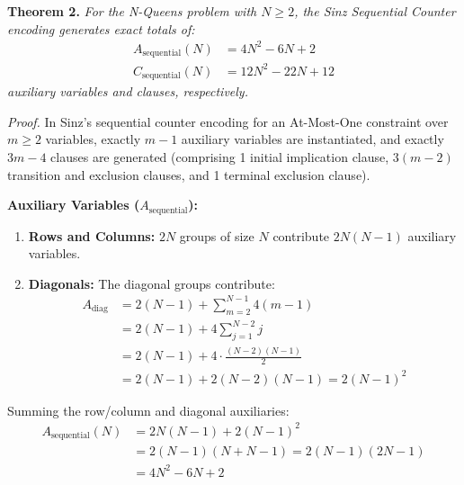 \textbf{Theorem 2.} \textit{For the N-Queens problem with $N \ge 2$, the Sinz Sequential Counter encoding generates exact totals of:}
\begin{align}
A_{\text{sequential}}(N) &= 4N^2 - 6N + 2 \\
C_{\text{sequential}}(N) &= 12N^2 - 22N + 12
\end{align}
\textit{auxiliary variables and clauses, respectively.}

\textit{Proof.} In Sinz's sequential counter encoding for an At-Most-One constraint over $m \ge 2$ variables, exactly $m - 1$ auxiliary variables are instantiated, and exactly $3m - 4$ clauses are generated (comprising 1 initial implication clause, $3(m-2)$ transition and exclusion clauses, and 1 terminal exclusion clause).

\textbf{Auxiliary Variables ($A_{\text{sequential}}$):}
\begin{enumerate}
    \item \textbf{Rows and Columns:} $2N$ groups of size $N$ contribute $2N(N-1)$ auxiliary variables.
    \item \textbf{Diagonals:} The diagonal groups contribute:
    \begin{align}
    A_{\text{diag}} &= 2(N-1) + \sum_{m=2}^{N-1} 4(m-1) \nonumber \\
    &= 2(N-1) + 4 \sum_{j=1}^{N-2} j \nonumber \\
    &= 2(N-1) + 4 \cdot \frac{(N-2)(N-1)}{2} \nonumber \\
    &= 2(N-1) + 2(N-2)(N-1) = 2(N-1)^2
    \end{align}
\end{enumerate}
Summing the row/column and diagonal auxiliaries:
\begin{align}
A_{\text{sequential}}(N) &= 2N(N-1) + 2(N-1)^2 \nonumber \\
&= 2(N-1)(N + N - 1) = 2(N-1)(2N-1) \nonumber \\
&= 4N^2 - 6N + 2
\end{align}

